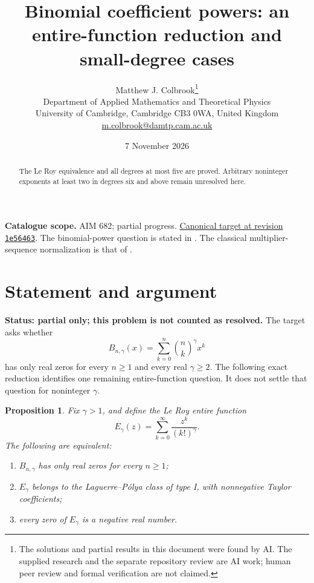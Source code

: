 \documentclass[11pt,a4paper]{article}
\newtheorem{proposition}[theorem]{Proposition}
\theoremstyle{remark}
\begin{document}
\title{Binomial coefficient powers: an entire-function reduction and small-degree cases}
\author{Matthew J. Colbrook\thanks{The solutions and partial results in this document were found by AI. The supplied research and the separate repository review are AI work; human peer review and formal verification are not claimed.}\\[4pt]
\small Department of Applied Mathematics and Theoretical Physics\\
\small University of Cambridge, Cambridge CB3 0WA, United Kingdom\\
\small\href{mailto:m.colbrook@damtp.cam.ac.uk}{m.colbrook@damtp.cam.ac.uk}}
\date{7 November 2026}
\maketitle
\begin{abstract}
The Le Roy equivalence and all degrees at most five are proved. Arbitrary noninteger exponents at least two in degrees six and above remain unresolved here.
\end{abstract}
\noindent\textbf{Catalogue scope.} AIM 682; partial progress. \href{https://github.com/MColbrook/AIM/blob/1e564633494c109edfd3ec46da1366adcff925a5/problems/682-real-rootedness-of-real-powers-of-binomial-coefficients.md}{Canonical target at revision \texttt{1e56463}}.
The binomial-power question is stated in \cite[Section 4.5]{Jalowy}. The classical multiplier-sequence normalization is that of \cite[Theorem 6]{CsordasForgacs}.

\section{Statement and argument}
\label{sec:682partial}

\textbf{Status: partial only; this problem is not counted as resolved.}
The target asks whether
\[
 B_{n,\gamma}(x)=\sum_{k=0}^n\binom nk^\gamma x^k
\]
has only real zeros for every $n\ge1$ and every real $\gamma\ge2$.
The following exact reduction identifies one remaining entire-function
question.  It does not settle that question for noninteger $\gamma$.

\begin{proposition}
Fix $\gamma>1$, and define the Le Roy entire function
\[
 E_\gamma(z)=\sum_{k=0}^\infty\frac{z^k}{(k!)^\gamma}.
\]
The following are equivalent:
\begin{enumerate}
\item $B_{n,\gamma}$ has only real zeros for every $n\ge1$;
\item $E_\gamma$ belongs to the Laguerre--P\'olya class of type I, with
      nonnegative Taylor coefficients;
\item every zero of $E_\gamma$ is a negative real number.
\end{enumerate}
\end{proposition}
\end{document}

